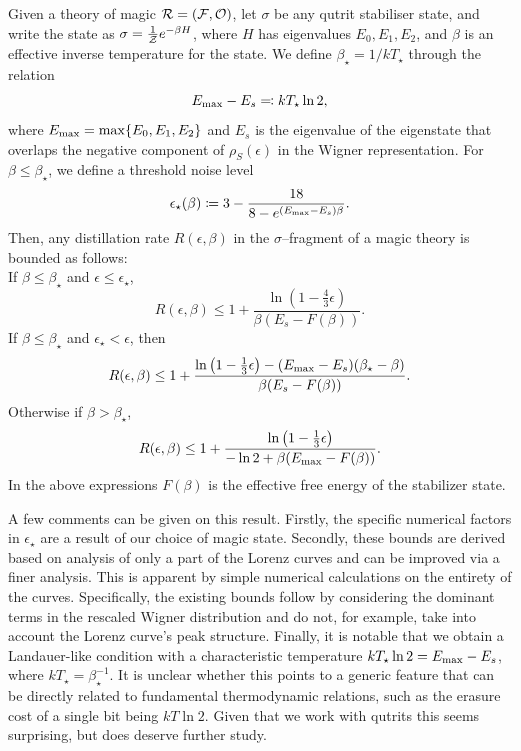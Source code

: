 \documentclass[pra,
aps,
twocolumn,
superscriptaddress,
groupedaddress,
nofootinbib,
reprint
]{revtex4-1}
\begin{document}
\begin{theorem}\label{thm:stab_bounds}
	Given a theory of magic $\mathcal{R} = (\mathcal{F}, \mathcal{O})$, let $\sigma$ be any qutrit stabiliser state, and write the state as $\sigma = \frac{1}{\mathcal{Z}} e^{-\beta H}$, where $H$ has eigenvalues $E_0, E_1, E_2$, and $\beta$ is an effective inverse temperature for the state. 
We define $\beta_\star = 1/kT_\star$ through the relation
\begin{equation}
	E_{\rm max} - E_s \eqqcolon kT_\star \ln 2,
\end{equation}
where $E_{\rm max} = \max\{E_0, E_1, E_2\}$ and $E_s$ is the eigenvalue of the eigenstate that overlaps the negative component of $\rho_S(\epsilon)$ in the Wigner representation. For $\beta \leq \beta_\star$, we define a threshold noise level
\begin{equation}
	\epsilon_{\star}(\beta) \coloneqq 3 - \dfrac{18}{8-e^{(E_{\rm max} - E_s)\beta}}.
\end{equation}
Then, any distillation rate $R(\epsilon, \beta)$ in the $\sigma$--fragment of a magic theory is bounded as follows:\\
If $\beta \leq \beta_{\star}$ and $\epsilon  \leq \epsilon_{\star}$,
\begin{equation}
	R(\epsilon,\beta) \leq 1 + \frac{\ln{\left( 1 - \frac{4}{3}\epsilon \right)}}{\beta (E_s - F(\beta))}.
\end{equation}
If $\beta \leq \beta_{\star}$ and $\epsilon_{\star} < \epsilon$, then
\begin{equation}
	R(\epsilon, \beta) \le 1 + \frac{\ln{\left(1-\frac{1}{3}\epsilon \right)} - (E_{\rm max} - E_s)(\beta_{\star} - \beta)}{\beta (E_s - F(\beta))}.
\end{equation}
Otherwise if $\beta > \beta_{\star}$,
\begin{equation}
	R(\epsilon, \beta) \leq  1+ \frac{\ln{\left(1-\frac{1}{3}\epsilon \right)}}{-\ln{2} + \beta (E_{\rm max} - F(\beta))}.
\end{equation}
In the above expressions $F(\beta)$ is the effective free energy of the stabilizer state.
\end{theorem}
A few comments can be given on this result. 
Firstly, the specific numerical factors in $\epsilon_\star$ are a result of our choice of magic state. 
Secondly, these bounds are derived based on analysis of only a part of the Lorenz curves and can be improved via a finer analysis. 
This is apparent by simple numerical calculations on the entirety of the curves.
Specifically, the existing bounds follow by considering the dominant terms in the rescaled Wigner distribution and do not, for example, take into account the Lorenz curve's peak structure. 
Finally, it is notable that we obtain a Landauer-like condition with a characteristic temperature $kT_\star \ln 2 = E_{\rm max} - E_s$, where $kT_\star = \beta_\star^{-1}$. 
It is unclear whether this points to a generic feature that can be directly related to fundamental thermodynamic relations, such as the erasure cost of a single bit being $kT \ln 2$. 
Given that we work with qutrits this seems surprising, but does deserve further study.
\end{document}
